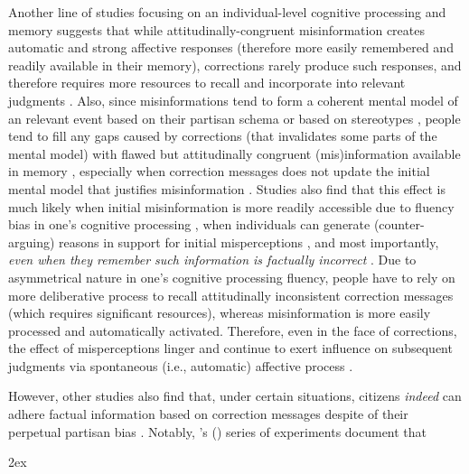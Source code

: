 \documentclass[man, 12pt, a4paper]{apa6}
\begin{document}
      Another line of studies focusing on an individual-level cognitive processing and memory suggests that while attitudinally-congruent misinformation creates automatic and strong affective responses (therefore more easily remembered and readily available in their memory), corrections rarely produce such responses, and therefore requires more resources to recall and incorporate into relevant judgments \parencite{thorson_2016, Lewandowsky_2012PSPI}. Also, since misinformations tend to form a coherent mental model of an relevant event based on their partisan schema or based on stereotypes \parencite[e.g.,][]{garrett2013undermining}, people tend to fill any gaps caused by corrections (that invalidates some parts of the mental model) with flawed but attitudinally congruent (mis)information available in memory \parencite{Lewandowsky_2012PSPI}, especially when correction messages does not update the initial mental model that justifies misinformation \parencite{Chan_debunking_meta_2017}. Studies also find that this effect is much likely when initial misinformation is more readily accessible due to fluency bias in one's cognitive processing \parencite{lazer2017combating, Lewandowsky_2012PSPI}, when individuals can generate (counter-arguing) reasons in support for initial misperceptions \parencite{garrett2013undermining, Chan_debunking_meta_2017}, and most importantly, \emph{even when they remember such information is factually incorrect} \parencite{Lewandowsky_2012PSPI}. Due to asymmetrical nature in one's cognitive processing fluency, people have to rely on more deliberative process to recall attitudinally inconsistent correction messages (which requires significant  resources), whereas misinformation is more easily processed and automatically activated. Therefore, even in the face of corrections, the effect of misperceptions linger and continue to exert influence on subsequent judgments via spontaneous (i.e., automatic) affective process \parencite[e.g.,][]{thorson_2016}.    
      
      However, other studies also find that, under certain situations, citizens \emph{indeed} can adhere factual information based on correction messages despite of their perpetual partisan bias \parencite[e.g.,][]{Wood2018, Garrett_Weeks_2013, weeks2015emotions}. Notably, \citeauthor{Wood2018}'s (\citeyear{Wood2018}) series of experiments document that    




\printbibliography
\newpage
\begingroup
\parindent 0pt
\parskip 2ex
\def\enotesize{\normalsize}
\theendnotes
\endgroup
\end{document}
